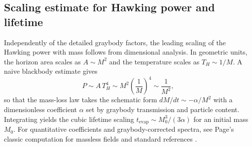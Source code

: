 \subsection{Scaling estimate for Hawking power and lifetime}
\label{app:hawking_scaling}
Independently of the detailed graybody factors, the leading scaling of the Hawking power with mass follows from dimensional analysis. In geometric units, the horizon area scales as $A\sim M^2$ and the temperature scales as $T_H\sim 1/M$. A naive blackbody estimate gives
\begin{equation}
  P \sim A\,T_H^4 \sim M^2\left(\frac{1}{M}\right)^4 \sim \frac{1}{M^2},
\end{equation}
so that the mass-loss law takes the schematic form $dM/dt\sim -\alpha/M^2$ with a dimensionless coefficient $\alpha$ set by graybody transmission and particle content. Integrating yields the cubic lifetime scaling $t_{\mathrm{evap}}\sim M_0^3/(3\alpha)$ for an initial mass $M_0$. For quantitative coefficients and graybody-corrected spectra, see Page's classic computation for massless fields \cite{Page1976Emission} and standard references \cite{BirrellDavies1982,Wald1994}.

